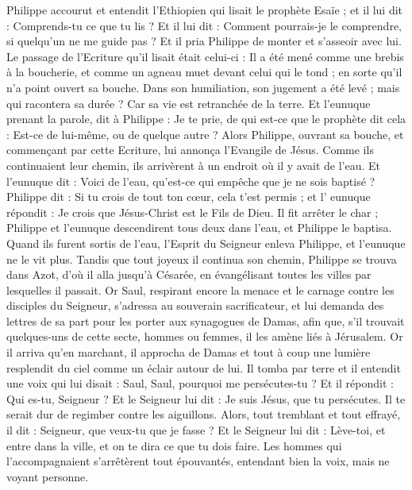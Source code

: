 \begin{multicols}{2}
{Philippe accourut et entendit l'Ethiopien qui lisait le prophète Esaïe ; et il lui dit : Comprends-tu ce que tu lis ?
Et il lui dit : Comment pourrais-je le comprendre, si quelqu'un ne me guide pas ? Et il pria Philippe de monter et s'asseoir avec lui.
Le passage de l'Ecriture qu'il lisait était celui-ci : Il a été mené comme une brebis à la boucherie, et comme un agneau muet devant celui qui le tond ; en sorte qu'il n'a point ouvert sa bouche.
Dans son humiliation, son jugement a été levé ; mais qui racontera sa durée ? Car sa vie est retranchée de la terre.
Et l'eunuque prenant la parole, dit à Philippe : Je te prie, de qui est-ce que le prophète dit cela : Est-ce de lui-même, ou de quelque autre ?
Alors Philippe, ouvrant sa bouche, et commençant par cette Ecriture, lui annonça l'Evangile de Jésus.
Comme ils continuaient leur chemin, ils arrivèrent à un endroit où il y avait de l'eau. Et l'eunuque dit : Voici de l'eau, qu'est-ce qui empêche que je ne sois baptisé ?
Philippe dit : Si tu crois de tout ton cœur, cela t'est permis ; et l' eunuque répondit : Je crois que Jésus-Christ est le Fils de Dieu.
Il fit arrêter le char ; Philippe et l'eunuque descendirent tous deux dans l'eau, et Philippe le baptisa.
Quand ils furent sortis de l'eau, l'Esprit du Seigneur enleva Philippe, et l'eunuque ne le vit plus. Tandis que tout joyeux il continua son chemin,
Philippe se trouva dans Azot, d'où il alla jusqu'à Césarée, en évangélisant toutes les villes par lesquelles il passait.
\VerseOne{}Or Saul, respirant encore la menace et le carnage contre les disciples du Seigneur, s'adressa au souverain sacrificateur,
et lui demanda des lettres de sa part pour les porter aux synagogues de Damas, afin que, s'il trouvait quelques-uns de cette secte, hommes ou femmes, il les amène liés à Jérusalem.
Or il arriva qu'en marchant, il approcha de Damas et tout à coup une lumière resplendit du ciel comme un éclair autour de lui.
Il tomba par terre et il entendit une voix qui lui disait : Saul, Saul, pourquoi me persécutes-tu ?
Et il répondit : Qui es-tu, Seigneur ? Et le Seigneur lui dit : Je suis Jésus, que tu persécutes. Il te serait dur de regimber contre les aiguillons.
Alors, tout tremblant et tout effrayé, il dit : Seigneur, que veux-tu que je fasse ? Et le Seigneur lui dit : Lève-toi, et entre dans la ville, et on te dira ce que tu dois faire.
Les hommes qui l'accompagnaient s'arrêtèrent tout épouvantés, entendant bien la voix, mais ne voyant personne.
}
\end{multicols}
